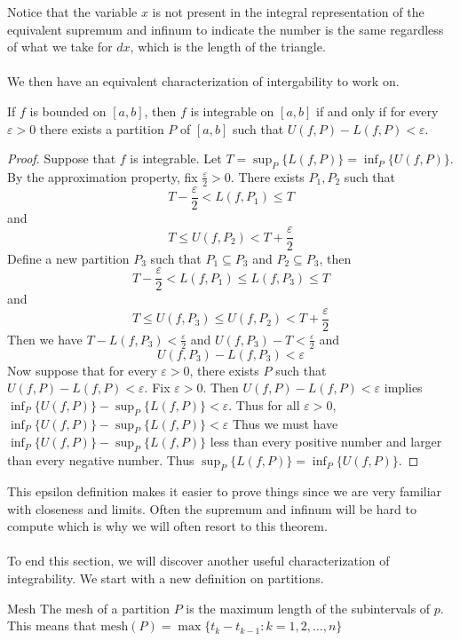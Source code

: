 \documentclass[a4paper]{article}
\begin{document}
Notice that the variable $x$ is not present in the integral representation of the equivalent supremum and infinum to indicate the number is the same regardless of what we take for $dx$, which is the length of the triangle. \\~\\
We then have an equivalent characterization of intergability to work on. 

\begin{thm}{}{} If $f$ is bounded on $[a,b]$, then $f$ is integrable on $[a,b]$ if and only if for every $\varepsilon>0$ there exists a partition $P$ of $[a,b]$ such that $U(f,P)-L(f,P)<\varepsilon$. \tcbline
\begin{proof} Suppose that $f$ is integrable. Let $T=\sup_P\{L(f,P)\}=\inf_P\{U(f,P)\}$. By the approximation property, fix $\frac{\varepsilon}{2}>0$. There exists $P_1,P_2$ such that $$T-\frac{\varepsilon}{2}<L(f,P_1)\leq T$$ and $$T\leq U(f,P_2)<T+\frac{\varepsilon}{2}$$ Define a new partition $P_3$ such that $P_1\subseteq P_3$ and $P_2\subseteq P_3$, then $$T-\frac{\varepsilon}{2}<L(f,P_1)\leq L(f,P_3)\leq T$$ and $$T\leq U(f,P_3)\leq U(f,P_2)<T+\frac{\varepsilon}{2}$$ Then we have $T-L(f,P_3)<\frac{\varepsilon}{2}$ and $U(f,P_3)-T<\frac{\varepsilon}{2}$ and $$U(f,P_3)-L(f,P_3)<\varepsilon$$
Now suppose that for every $\varepsilon>0$, there exists $P$ such that $U(f,P)-L(f,P)<\varepsilon$. Fix $\varepsilon>0$. Then $U(f,P)-L(f,P)<\varepsilon$ implies $\inf_P\{U(f,P)\}-\sup_P\{L(f,P)\}<\varepsilon$. Thus for all $\varepsilon>0$, $\inf_P\{U(f,P)\}-\sup_P\{L(f,P)\}<\varepsilon$ Thus we must have $\inf_P\{U(f,P)\}-\sup_P\{L(f,P)\}$ less than every positive number and larger than every negative number. Thus $\sup_P\{L(f,P)\}=\inf_P\{U(f,P)\}$. 
\end{proof}
\end{thm}

This epsilon definition makes it easier to prove things since we are very familiar with closeness and limits. Often the supremum and infinum will be hard to compute which is why we will often resort to this theorem. \\~\\
To end this section, we will discover another useful characterization of integrability. We start with a new definition on partitions. 

\begin{defn}{Mesh}{} The mesh of a partition $P$ is the maximum length of the subintervals of $p$. This means that $\text{mesh}(P)=\max\{t_k-t_{k-1}:k=1,2,\dots,n\}$
\end{defn}
\end{document}
